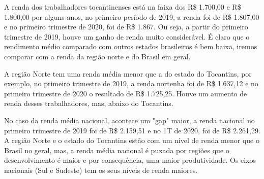 \par A renda dos trabalhadores tocantinenses está na faixa dos R\$ 1.700,00 e R\$ 1.800,00 por alguns anos, no primeiro período de 2019, a renda foi de R\$ 1.807,00 e no primeiro trimestre de 2020, foi de R\$ 1.867. Ou seja, a partir do primeiro trimestre de 2019, houve um ganho de renda muito considerável. É claro que o rendimento médio comparado com outros estados brasileiros é bem baixa, iremos comparar com a renda da região norte e do Brasil em geral.


\par A região Norte tem uma renda média menor que a do estado do Tocantins, por exemplo, no primeiro trimestre de 2019, a renda nortenha foi de R\$ 1.637,12 e no primeiro trimestre de 2020 o resultado de R\$ 1.725,25. Houve um aumento de renda desses trabalhadores, mas, abaixo do Tocantins.



\par No caso da renda média nacional, acontece um "gap" maior, a renda nacional no primeiro trimestre de 2019 foi de R\$ 2.159,51 e no 1T de 2020, foi de R\$ 2.261,29. A região Norte e o estado do Tocantins estão com um nível de renda menor que o Brasil no geral, mas, a renda média nacional é puxada por regiões que o desenvolvimento é maior e por consequência, uma maior produtividade. Os eixos nacionais (Sul e Sudeste) tem os seus níveis de renda maiores.
